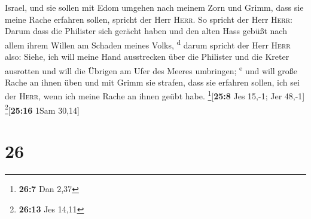 Israel, und sie sollen mit Edom umgehen nach meinem Zorn und Grimm, dass
sie meine Rache erfahren sollen, spricht der Herr \textsc{Herr}.
 So spricht der Herr \textsc{Herr}: Darum dass die
Philister sich gerächt haben und den alten Hass gebüßt nach allem ihrem
Willen am Schaden meines Volks, \textsuperscript{d} 
darum spricht der Herr \textsc{Herr} also: Siehe, ich will meine Hand
ausstrecken über die Philister und die Kreter ausrotten und will die
Übrigen am Ufer des Meeres umbringen; \textsuperscript{e}
 und will große Rache an ihnen üben und mit Grimm sie
strafen, dass sie erfahren sollen, ich sei der \textsc{Herr}, wenn ich
meine Rache an ihnen geübt habe. \footnote{\textbf{26:7} Dan 2,37}{[}\textbf{25:8}
Jes 15,-1; Jer 48,-1{]} \footnote{\textbf{26:13} Jes 14,11}{[}\textbf{25:16}
1Sam 30,14{]}

\hypertarget{section-25}{%
\section{26}\label{section-25}}

